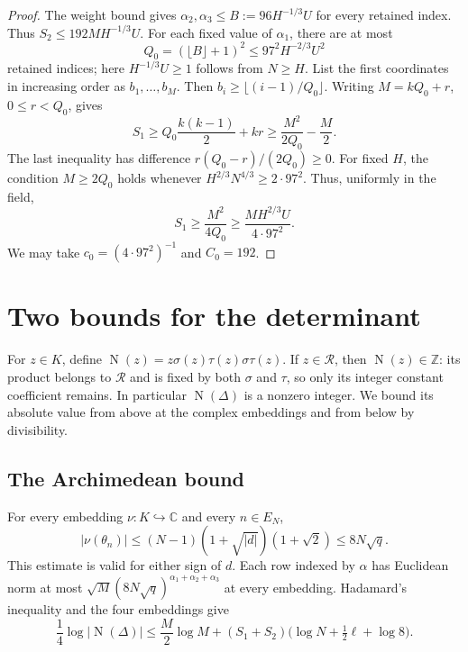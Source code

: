 \documentclass[11pt,a4paper]{amsart}
\theoremstyle{remark}
\newcommand{\Z}{\mathbb Z}
\newcommand{\C}{\mathbb C}
\newcommand{\cR}{\mathcal R}
\DeclareMathOperator{\Nm}{N}
\numberwithin{equation}{section}
\begin{document}
\begin{proof}
The weight bound gives
$\alpha_2,\alpha_3\le B:=96H^{-1/3}U$ for every retained index.
Thus $S_2\le192MH^{-1/3}U$. For each fixed value of $\alpha_1$,
there are at most
\[
 Q_0=(\lfloor B\rfloor+1)^2\le97^2H^{-2/3}U^2
\]
retained indices; here $H^{-1/3}U\ge1$ follows from $N\ge H$.
List the first coordinates in increasing order as
$b_1,\ldots,b_M$. Then $b_i\ge\lfloor(i-1)/Q_0\rfloor$.
Writing $M=kQ_0+r$, $0\le r<Q_0$, gives
\[
 S_1\ge Q_0\frac{k(k-1)}2+kr
 \ge\frac{M^2}{2Q_0}-\frac M2.
\]
The last inequality has difference $r(Q_0-r)/(2Q_0)\ge0$.
For fixed $H$, the condition $M\ge2Q_0$ holds whenever
$H^{2/3}N^{4/3}\ge2\cdot97^2$. Thus, uniformly in the field,
\[
 S_1\ge\frac{M^2}{4Q_0}
 \ge\frac{MH^{2/3}U}{4\cdot97^2}.
\]
We may take $c_0=(4\cdot97^2)^{-1}$ and $C_0=192$.
\end{proof}

\section{Two bounds for the determinant}\label{sec:comparison}

For $z\in K$, define
$\Nm(z)=z\sigma(z)\tau(z)\sigma\tau(z)$.
If $z\in\cR$, then $\Nm(z)\in\Z$: its product belongs to
$\cR$ and is fixed by both $\sigma$ and $\tau$, so only its
integer constant coefficient remains. In particular
$\Nm(\Delta)$ is a nonzero integer. We bound its absolute value
from above at the complex embeddings and from below by divisibility.

\subsection*{The Archimedean bound}
For every embedding $\nu:K\hookrightarrow\C$ and every $n\in E_N$,
\[
 |\nu(\theta_n)|
 \le(N-1)(1+\sqrt{|d|})(1+\sqrt2)
 \le8N\sqrt q.
\]
This estimate is valid for either sign of $d$. Each row indexed by
$\alpha$ has Euclidean norm at most
$\sqrt M(8N\sqrt q)^{\alpha_1+\alpha_2+\alpha_3}$ at every embedding.
Hadamard's inequality and the four embeddings give
\begin{equation}\label{eq:upper}
 \frac14\log|\Nm(\Delta)|
 \le\frac M2\log M+
 (S_1+S_2)\bigl(\log N+\tfrac12\ell+\log8\bigr).
\end{equation}
\end{document}
